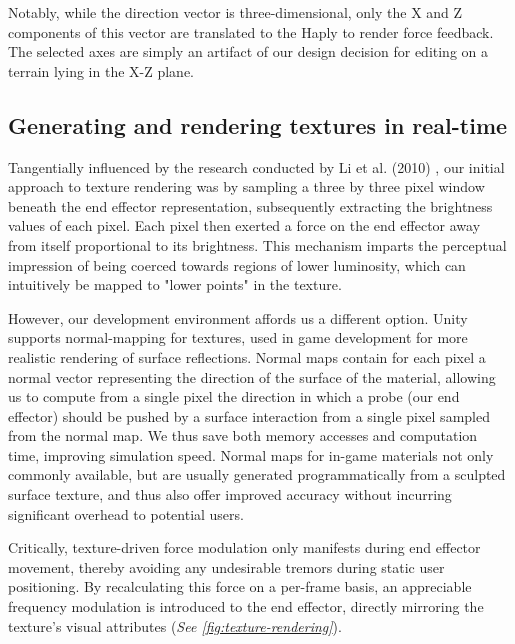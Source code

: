 Notably, while the direction vector is three-dimensional, only the X and Z components of this vector are translated to the Haply to render force feedback. The selected axes are simply an artifact of our design decision for editing on a terrain lying in the X-Z plane.

\subsection{Generating and rendering textures in real-time} \label{subsec:texture-rendering}

Tangentially influenced by the research conducted by Li et al. (2010) \cite{li2010image}, our initial approach to texture rendering was by sampling a three by three pixel window beneath the end effector representation, subsequently extracting the brightness values of each pixel. Each pixel then exerted a force on the end effector away from itself proportional to its brightness. This mechanism imparts the perceptual impression of being coerced towards regions of lower luminosity, which can intuitively be mapped to "lower points" in the texture.

However, our development environment affords us a different option. Unity supports normal-mapping for textures, used in game development for more realistic rendering of surface reflections. Normal maps contain for each pixel a normal vector representing the direction of the surface of the material, allowing us to compute from a single pixel the direction in which a probe (our end effector) should be pushed by a surface interaction from a single pixel sampled from the normal map. We thus save both memory accesses and computation time, improving simulation speed. Normal maps for in-game materials not only commonly available, but are usually generated programmatically from a sculpted surface texture, and thus also offer improved accuracy without incurring significant overhead to potential users.

Critically, texture-driven force modulation only manifests during end effector movement, thereby avoiding any undesirable tremors during static user positioning. By recalculating this force on a per-frame basis, an appreciable frequency modulation is introduced to the end effector, directly mirroring the texture's visual attributes (\textit{See \ref{fig:texture-rendering}}).

